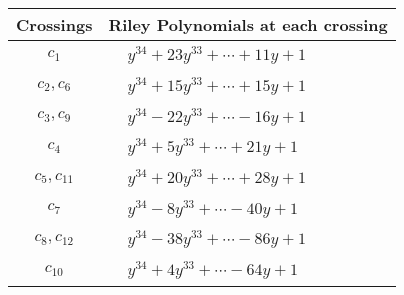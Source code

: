 \documentclass[1p]{elsarticle_modified}
\theoremstyle{definition}
\begin{document}
\begin{tabular}{m{50pt}|m{274pt}}
Crossings & \hspace{64pt}Riley Polynomials at each crossing \\
\hline $$\begin{aligned}c_{1}\end{aligned}$$&$\begin{aligned}
&y^{34}+23 y^{33}+\cdots+11 y+1
\end{aligned}$\\
\hline $$\begin{aligned}c_{2},c_{6}\end{aligned}$$&$\begin{aligned}
&y^{34}+15 y^{33}+\cdots+15 y+1
\end{aligned}$\\
\hline $$\begin{aligned}c_{3},c_{9}\end{aligned}$$&$\begin{aligned}
&y^{34}-22 y^{33}+\cdots-16 y+1
\end{aligned}$\\
\hline $$\begin{aligned}c_{4}\end{aligned}$$&$\begin{aligned}
&y^{34}+5 y^{33}+\cdots+21 y+1
\end{aligned}$\\
\hline $$\begin{aligned}c_{5},c_{11}\end{aligned}$$&$\begin{aligned}
&y^{34}+20 y^{33}+\cdots+28 y+1
\end{aligned}$\\
\hline $$\begin{aligned}c_{7}\end{aligned}$$&$\begin{aligned}
&y^{34}-8 y^{33}+\cdots-40 y+1
\end{aligned}$\\
\hline $$\begin{aligned}c_{8},c_{12}\end{aligned}$$&$\begin{aligned}
&y^{34}-38 y^{33}+\cdots-86 y+1
\end{aligned}$\\
\hline $$\begin{aligned}c_{10}\end{aligned}$$&$\begin{aligned}
&y^{34}+4 y^{33}+\cdots-64 y+1
\end{aligned}$\\
\hline
\end{tabular}\\~\\
\end{document}
